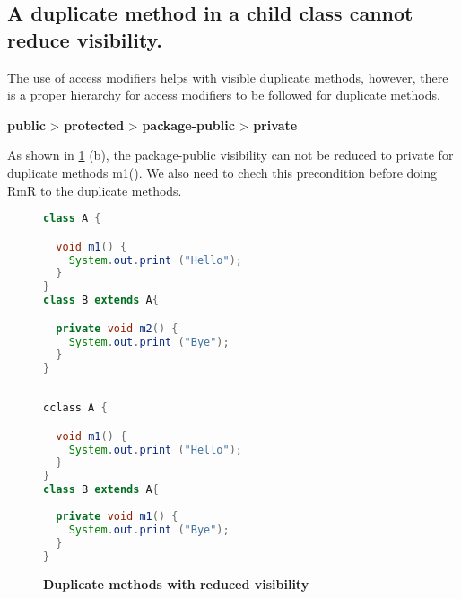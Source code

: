 \subsection{A duplicate method in a child class cannot reduce visibility.}

The use of access modifiers helps with visible duplicate methods, however, there is a proper hierarchy for access modifiers to be followed for duplicate methods.

\textbf{public} > \textbf{protected} > \textbf{package-public} > \textbf{private}

As shown in \ref{fig:RmR3} (b), the package-public visibility can not be reduced to private for duplicate methods m1(). We also need to chech this precondition before doing RmR to the duplicate methods.

\begin{figure}[th]
\centering
\begin{minipage}[t]{0.7\linewidth}
\begin{lstlisting}[language=java, basicstyle=\scriptsize\ttfamily,frame=single]
class A {

  void m1() {
    System.out.print ("Hello");
  }
}
class B extends A{

  private void m2() {
    System.out.print ("Bye");
  }	
}
 
\end{lstlisting}
\end{minipage}
\hfill
\begin{minipage}[t]{0.7\linewidth}
\begin{lstlisting}[language=java, basicstyle=\scriptsize\ttfamily,frame=single]
cclass A {

  void m1() {
    System.out.print ("Hello");
  }
}
class B extends A{
 
  private void m1() {
    System.out.print ("Bye");
  }	
}

\end{lstlisting}
\end{minipage}
\caption{\textbf{Duplicate methods with reduced visibility}}
\label{fig:RmR3}
\end{figure}